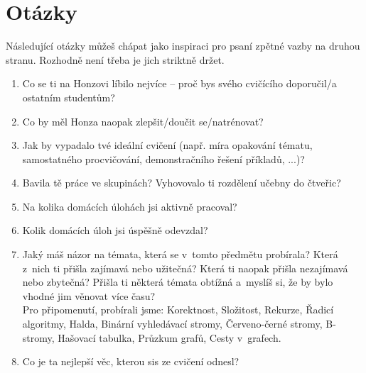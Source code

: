 \documentclass[12pt,a5paper]{article}
\begin{document}
\newpage

\section*{Otázky}

Následující otázky můžeš chápat jako inspiraci pro psaní zpětné vazby na
druhou stranu. Rozhodně není třeba je jich striktně držet.

\begin{enumerate}
	\item Co se ti na Honzovi líbilo nejvíce – proč bys svého cvičícího
	doporučil/a ostatním studentům?
	\item Co by měl Honza naopak zlepšit/doučit se/natrénovat?
	\item Jak by vypadalo tvé ideální cvičení (např. míra opakování tématu,
		  samostatného procvičování, demonstračního řešení příkladů, ...)?
	\item Bavila tě práce ve skupinách? Vyhovovalo ti rozdělení učebny do
	      čtveřic?
	\item Na kolika domácích úlohách jsi aktivně pracoval?
	\item Kolik domácích úloh jsi úspěšně odevzdal?
	\item Jaký máš názor na témata, která se v~tomto předmětu probírala? Která
	      z~nich ti přišla zajímavá nebo užitečná? Která ti naopak přišla
	      nezajímavá nebo zbytečná? Přišla ti některá témata obtížná a~myslíš si,
	      že by bylo vhodné jim věnovat více času? \\
	      Pro připomenutí, probírali jsme: Korektnost, Složitost, Rekurze,
	      Řadicí algoritmy, Halda, Binární vyhledávací stromy, Červeno-černé
	      stromy, B-stromy, Hašovací tabulka, Průzkum grafů, Cesty v~grafech.
	\item Co je ta nejlepší věc, kterou sis ze cvičení odnesl?
\end{enumerate}
\end{document}
